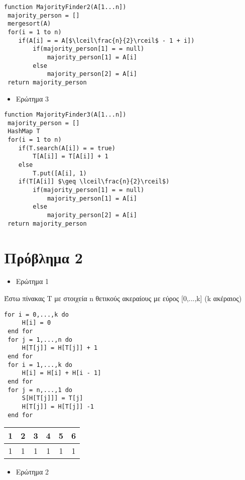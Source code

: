 \documentclass[a4paper]{article}
\begin{document}
\pagebreak

\begin{lstlisting}[mathescape]
function MajorityFinder2(A[1...n])
 majority_person = []
 mergesort(A)
 for(i = 1 to n)
 	if(A[i] = = A[$\lceil\frac{n}{2}\rceil$ - 1 + i])
 		if(majority_person[1] = = null)
 			majority_person[1] = A[i]
 		else
 			majority_person[2] = A[i]
 return majority_person
\end{lstlisting}

\begin{itemize}
\item Ερώτημα 3
\end{itemize}

\begin{lstlisting}[mathescape]
function MajorityFinder3(A[1...n])
 majority_person = []
 HashMap T
 for(i = 1 to n)
 	if(T.search(A[i]) = = true)
 		T[A[i]] = T[A[i]] + 1
 	else 
 		T.put([A[i], 1)
 	if(T[A[i]] $\geq \lceil\frac{n}{2}\rceil$)
 		if(majority_person[1] = = null)
 			majority_person[1] = A[i]
 		else
 			majority_person[2] = A[i]
 return majority_person
\end{lstlisting}

\section*{Πρόβλημα 2}

\begin{itemize}
\item Ερώτημα 1
\end{itemize}

\lstset{frame=none}
\begin{tcolorbox}[colback=blue!20!white,colframe=purple!60!white,title=\textbf{Algorithm 1}]
Έστω πίνακας T με στοιχεία n θετικούς ακεραίους με εύρος [0,...,k] (k ακέραιος)
\begin{lstlisting}[mathescape]
 for i = 0,...,k do
	 H[i] = 0
 end for
 for j = 1,...,n do
	 H[T[j]] = H[T[j]] + 1
 end for
 for i = 1,...,k do
	 H[i] = H[i] + H[i - 1]
 end for
 for j = n,...,1 do
	 S[H[T[j]]] = T[j]
	 H[T[j]] = H[T[j]] -1
 end for
\end{lstlisting}
\end{tcolorbox}

\begin{tabular}{|c|c|c|c|c|c|}
1 & 2 & 3 & 4 & 5 & 6\\
\hline
1 & 1 & 1 & 1 & 1 & 1\\\hline
\end{tabular}


\begin{itemize}
\item Ερώτημα 2
\end{itemize}
\end{document}
